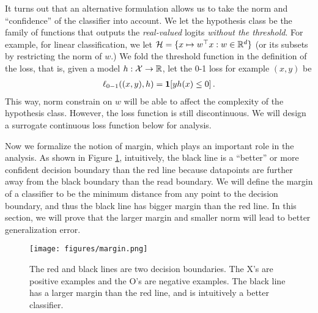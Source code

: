 It turns out that an alternative formulation allows us to take the norm and ``confidence'' of the classifier into account.  We let the hypothesis class be the family of functions that outputs the \textit{real-valued} logits \textit{without the threshold}. For example, for linear classification, we let $\mathcal H = \{x\mapsto w^\top x: w\in \mathbb R^d \}$ (or its subsets by restricting the norm of $w$.) We fold the threshold function in the definition of the loss, that is, given a model $h: \mathcal X \rightarrow \mathbb R$, let the 0-1 loss for example $(x,y)$ be
\begin{align}
\ell_{0-1}((x,y), h) = \mathbf{1}[yh(x) \le 0 ] \,. \label{eqn:17}
\end{align}
This way, norm constrain on $w$ will be able to affect the complexity of the hypothesis class. However, the loss function is still discontinuous. We will design a surrogate continuous loss function below for analysis.  


Now we formalize the notion of margin, which plays an important role in the analysis. 
As shown in Figure \ref{lec6:fig:margin}, intuitively, the black line is a ``better'' or more confident decision boundary than the red line because datapoints are further away from the black boundary than the read boundary.  
We will define the margin of a classifier to be the minimum distance from any point to the decision boundary, and thus the black line has bigger margin than the red line. 
In this section, we will prove that the larger margin and smaller norm will lead to better generalization error. 

\begin{figure}[t]
    \begin{center}
  \texttt{[image: figures/margin.png]}
  \end{center}
  \caption{The red and black lines are two decision boundaries. The X's are positive examples and the O's are negative examples. The black line has a larger margin than the red line, and is intuitively a better classifier.}
  \label{lec6:fig:margin}
\end{figure}

